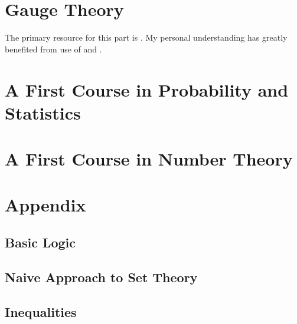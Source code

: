 \documentclass[10pt,twoside=false,open=any,numbers=noenddot]{scrbook}
\begin{document}
\part{Gauge Theory}
\vspace*{2em} The primary resource for this part is \cite{ref:hamilton_gauge}.  My personal understanding has greatly benefited from use of \cite{ref:baez_knots} and \cite{ref:garrity_em}.\vspace*{-1em}
\label{part:Gauge-Theory}
\parttoc


\part{ A First Course in Probability and Statistics}
\label{part:First-Course-Probability}
\parttoc


\part{A First Course in Number Theory}
\label{part:Basic-Number-Theory}
\parttoc



\appendix
\part{ Appendix} 
\label{part: Appendix}

\parttoc

\chapter{Basic Logic}
\label{ch:Logic}


\chapter{Naive Approach to Set Theory}
\label{ch:Naive Sets}


\chapter{Inequalities}
\label{ch:Inequalities}




\printbibliography[
heading=bibintoc,
title={Bibliography}
] 
\end{document}
